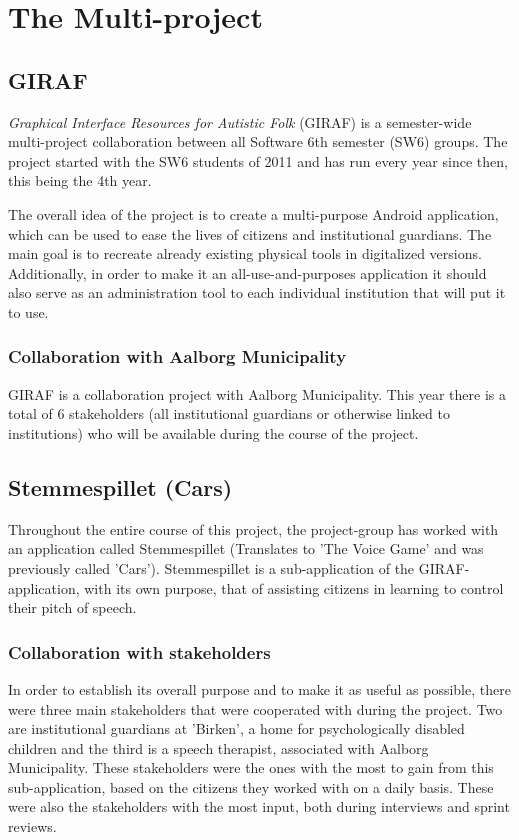 
\section{The Multi-project}

\subsection{GIRAF}
\textit{Graphical Interface Resources for Autistic Folk} (GIRAF) is a semester-wide multi-project collaboration between all Software 6th semester (SW6) groups.
The project started with the SW6 students of 2011 and has run every year since then, this being the 4th year.

The overall idea of the project is to create a multi-purpose Android application, which can be used to ease the lives of citizens and institutional guardians.
The main goal is to recreate already existing physical tools in digitalized versions.
Additionally, in order to make it an all-use-and-purposes application it should also serve as an administration tool to each individual institution that will put it to use.

\subsubsection{Collaboration with Aalborg Municipality}
GIRAF is a collaboration project with Aalborg Municipality.
This year there is a total of 6 stakeholders (all institutional guardians or otherwise linked to institutions) who will be available during the course of the project.

\subsection{Stemmespillet (Cars)}
Throughout the entire course of this project, the project-group has worked with an application called Stemmespillet (Translates to 'The Voice Game' and was previously called 'Cars').
Stemmespillet is a sub-application of the GIRAF-application, with its own purpose, that of assisting citizens in learning to control their pitch of speech.

\subsubsection{Collaboration with stakeholders}
In order to establish its overall purpose and to make it as useful as possible, there were three main stakeholders that were cooperated with during the project.
Two are institutional guardians at 'Birken', a home for psychologically disabled children and the third is a speech therapist, associated with Aalborg Municipality.
These stakeholders were the ones with the most to gain from this sub-application, based on the citizens they worked with on a daily basis.
These were also the stakeholders with the most input, both during interviews and sprint reviews.

